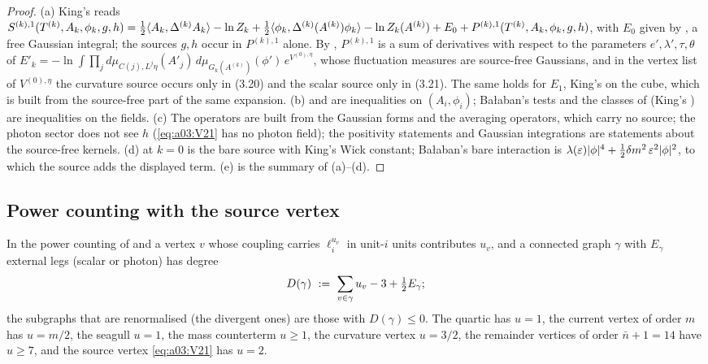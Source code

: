 \begin{proof}
(a) King's \cite[(3.14)]{K1} reads $S^{(k),1}(T^{(k)},A_k,\phi_k,g,h)=\frac12\langle A_k,\Delta^{(k)}A_k\rangle-\ln Z_k+\frac12\langle \phi_k,\Delta^{(k)}(A^{(k)})\phi_k\rangle-\ln Z_k(A^{(k)})+E_0+P^{(k),1}(T^{(k)},A_k,\phi_k,g,h)$, with $E_0$ given by \cite[(3.15)]{K1}, a free Gaussian integral; the sources $g,h$ occur in $P^{(k),1}$ alone. By \cite[(3.17)]{K1}, $P^{(k),1}$ is a sum of derivatives with respect to the parameters $e',\lambda',\tau,\theta$ of $E'_k=-\ln\int\prod_jd\mu_{C(j),L^j\eta}(A'_j)\,d\mu_{G_k(A^{(k)})}(\phi')\,e^{V^{(0),\eta}}$, whose fluctuation measures are source-free Gaussians, and in the vertex list \cite[(3.18)--(3.26)]{K1} of $V^{(0),\eta}$ the curvature source occurs only in (3.20) and the scalar source only in (3.21). The same holds for $E_1$, King's \cite[(3.35)]{K1} on the cube, which is built from the source-free part of the same expansion. (b) \cite[(3.2)]{K1} and \cite[(5.41)]{K2} are inequalities on $(A_i,\phi_i)$; Ba{\l}aban's tests \cite[(2.2)--(2.10)]{Ba2} and the classes of \cite[Sect.~3]{Ba1} (King's \cite[(A.1)]{K1}) are inequalities on the fields. (c) The operators are built from the Gaussian forms and the averaging operators, which carry no source; the photon sector does not see $h$ (\eqref{eq:a03:V21} has no photon field); the positivity statements and Gaussian integrations are statements about the source-free kernels. (d) \cite[(3.21)]{K1} at $k=0$ is the bare source with King's Wick constant; Ba{\l}aban's bare interaction \cite[p.~559]{Ba2} is $\lambda(\varepsilon)|\phi|^4+\frac12\delta m^2\,\varepsilon^2|\phi|^2$, to which the source adds the displayed term. (e) is the summary of (a)--(d).
\end{proof}

\subsection{Power counting with the source vertex}\label{ssec:a03:PC}

In the power counting of \cite[Sect.~3]{K1} and \cite[Sects.~1--3]{Ba3} a vertex $v$ whose coupling carries $\ell_i^{u_v}$ in unit-$i$ units contributes $u_v$, and a connected graph $\gamma$ with $E_\gamma$ external legs (scalar or photon) has degree
\begin{equation}\label{eq:a03:degree}
D(\gamma)\ :=\ \sum_{v\in\gamma}u_v-3+\tfrac12E_\gamma ;
\end{equation}
the subgraphs that are renormalised (the divergent ones) are those with $D(\gamma)\le0$. The quartic has $u=1$, the current vertex of order $m$ has $u=m/2$, the seagull $u=1$, the mass counterterm $u\ge1$, the curvature vertex $u=3/2$, the remainder vertices of order $\bar n+1=14$ have $u\ge7$, and the source vertex \eqref{eq:a03:V21} has $u=2$.

